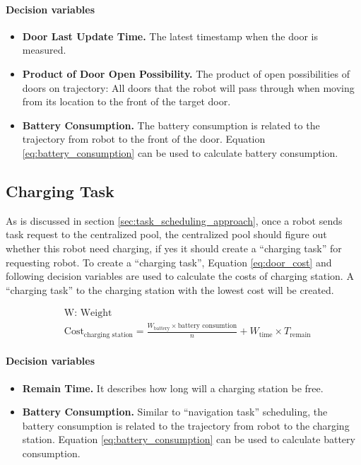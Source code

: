 \paragraph{Decision variables}
\begin{itemize}
	\item \textbf{Door Last Update Time.} The latest timestamp when the door is measured.
	\item \textbf{Product of Door Open Possibility.} The product of open possibilities of doors on trajectory: All doors that the robot will pass through when moving from its location to the front of the target door.
	\item \textbf{Battery Consumption.} The battery consumption is related to the trajectory from robot to the front of the door. Equation \ref{eq:battery_consumption} can be used to calculate battery consumption.
\end{itemize}



\subsection{Charging Task}
As is discussed in section \ref{sec:task_scheduling_approach}, once a robot sends task request to the centralized pool, the centralized pool should figure out whether this robot need charging, if yes it should create a ``charging task'' for requesting robot. 
To create a ``charging task'', Equation \ref{eq:door_cost} and following decision variables are used to calculate the costs of charging station. A ``charging task'' to the charging station with the lowest cost will be created.

\begin{equation}	
\label{eq:charging_station_cost}
\begin{aligned}
	& \mbox{W: Weight } \\
	& \mbox{Cost}_{\mbox{charging station}} = \frac{W_{\mbox{battery}} \times \mbox{battery consumtion}}{n} + W_{\mbox{time}} \times T_{\mbox{remain}}
\end{aligned}
\end{equation}


\paragraph{Decision variables}
\begin{itemize}
	\item \textbf{Remain Time.} It describes how long will a charging station be free. 
	\item \textbf{Battery Consumption.} Similar to ``navigation task'' scheduling, the battery consumption is related to the trajectory from robot to the charging station. Equation \ref{eq:battery_consumption} can be used to calculate battery consumption.
\end{itemize}


